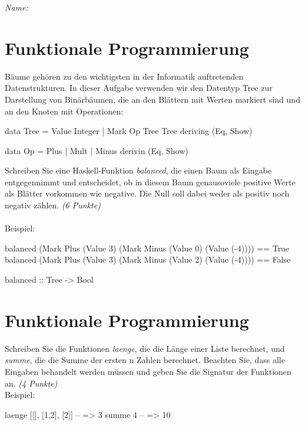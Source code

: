 \documentclass[11pt,a4paper,oneside,ngerman]{scrbook}
\begin{document}
\emph{Name:} \hrulefill


\section{Funktionale Programmierung}
Bäume gehören zu den wichtigsten in der Informatik auftretenden Datenstrukturen. In dieser Aufgabe verwenden wir den Datentyp Tree zur Darstellung von Binärbäumen, die an den Blättern mit Werten markiert sind und an den Knoten mit Operationen:

\begin{code}
    data Tree = 
            Value Integer
          | Mark Op Tree Tree
          deriving (Eq, Show)

    data Op = Plus | Mult | Minus
          derivin (Eq, Show)
\end{code}

Schreiben Sie eine Haskell-Funktion \emph{balanced}, die einen Baum als Eingabe entgegennimmt und entscheidet, ob in diesem Baum genausoviele positive Werte als Blätter vorkommen wie negative. Die Null soll dabei weder als positiv noch negativ zählen. \emph{(6 Punkte)}\\
\\
Beispiel:
\begin{code}
  balanced (Mark Plus (Value 3) (Mark Minus (Value 0) (Value (-4)))) == True
  balanced (Mark Plus (Value 3) (Mark Minus (Value 2) (Value (-4)))) == False
\end{code}

\begin{code}
  balanced :: Tree -> Bool
\end{code}

\newpage


\section{Funktionale Programmierung}
Schreiben Sie die Funktionen \emph{laenge}, die die Länge einer Liste berechnet, und \emph{summe}, die die Summe der ersten n Zahlen berechnet. Beachten Sie, dass alle Eingaben behandelt werden müssen und geben Sie die Signatur der Funktionen an. \emph{(4 Punkte)}\\
Beispiel:
\begin{code}
  laenge [[], [1,2], [2]]     -- => 3
  summe 4                     -- => 10










\end{code}
\end{document}
